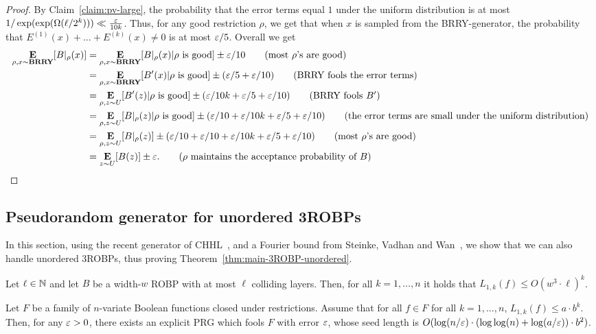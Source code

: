 {\begin{proof}
By Claim~\ref{claim:pv-large}, the probability that the error terms equal $1$ under the uniform distribution is at most $1/\exp(\exp(\Omega(\ell/2^{k}))) \ll \frac{\varepsilon}{10k}$. Thus, for any good restriction $\rho$, we get that when $x$ is sampled from the BRRY-generator, the probability that $E^{(1)}(x) + \ldots + E^{(k)}(x) \neq 0$ is at most $\varepsilon/5$.
Overall we get
\begin{align*}
\mathop{\bf E\/}_{\rho, x\sim {\mathbf{BRRY}}}[B|_{\rho}(x)] 
&= \mathop{\bf E\/}_{\rho, x\sim {\mathbf{BRRY}}}[B|_{\rho}(x)| \rho\text{ is good}] \pm \varepsilon/10\tag{most $\rho$'s are good}\\
&= \mathop{\bf E\/}_{\rho, x\sim {\mathbf{BRRY}}}[B'(x)| \rho\text{ is good}] \pm (\varepsilon/5 + \varepsilon/10)\tag{BRRY fools the error terms}\\
&= \mathop{\bf E\/}_{\rho, z\sim U}[B'(z)| \rho\text{ is good}] \pm (\varepsilon/10k + \varepsilon/5 + \varepsilon/10)\tag{BRRY fools $B'$}\\
&= \mathop{\bf E\/}_{\rho, z\sim U}[B|_{\rho}(z)| \rho\text{ is good}] \pm (\varepsilon/10 + \varepsilon/10k + \varepsilon/5 + \varepsilon/10)\tag{the error terms are small under the uniform distribution}\\
&= \mathop{\bf E\/}_{\rho, z\sim U}[B|_{\rho}(z)] \pm (\varepsilon/10 + \varepsilon/10 + \varepsilon/10k + \varepsilon/5 + \varepsilon/10)\tag{most $\rho$'s are good}\\
&= \mathop{\bf E\/}_{z\sim U}[B(z)] \pm \varepsilon.\tag{$\rho$ maintains the acceptance probability of $B$}
\end{align*}

\end{proof}

}
\subsection{Pseudorandom generator for unordered 3ROBPs}
In this section, using the recent generator of CHHL~\cite{CHHL18}, 
and a Fourier bound from Steinke, Vadhan and Wan~\cite{SteinkeVW14}, 
we show that we can also handle unordered 3ROBPs, thus proving Theorem~\ref{thm:main-3ROBP-unordered}.
\begin{lemma}
	Let $\ell\in {\mathbb{N}}$ and let $B$ be a width-$w$ ROBP with at most $\ell$ colliding layers. 
	Then, for all $k=1, \ldots, n$ it holds that $L_{1,k}(f) \le O(w^{3}\cdot \ell)^{k}$.
\end{lemma}

\begin{theorem} 
Let $F$ be a family of $n$-variate Boolean functions closed under restrictions. Assume that for all $f\in F$ for all $k=1,\ldots, n$, $L_{1,k}(f) \le a\cdot b^k$.
Then, for any $\varepsilon>0$, there exists an explicit PRG which fools $F$ with error $\varepsilon$, whose seed length is 
$O( \log(n/\varepsilon) \cdot (\log\log(n) + \log(a/\varepsilon)) \cdot b^2)$. 
\end{theorem}
	
